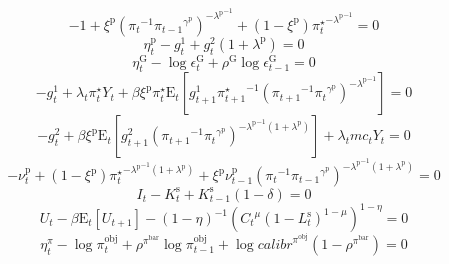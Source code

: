 \begin{equation}
-1 + {\xi^{\mathrm{p}}} {\left({\pi_{t}}^{-1} {{\pi_{t-1}}^{\gamma^{\mathrm{p}}}}\right)^{-{\lambda^{\mathrm{p}}}^{-1}}} + \left(1 - \xi^{\mathrm{p}}\right) {{\pi^{\star}_{t}}^{-{\lambda^{\mathrm{p}}}^{-1}}} = 0
\end{equation}
\begin{equation}
\eta^{\mathrm{p}}_{t} - g^{\mathrm{1}}_{t} + {g^{\mathrm{2}}_{t}} \left(1 + \lambda^{\mathrm{p}}\right) = 0
\end{equation}
\begin{equation}
\eta^{\mathrm{G}}_{t} - \log{\epsilon^{\mathrm{G}}_{t}} + {\rho^{\mathrm{G}}} {\log{\epsilon^{\mathrm{G}}_{t-1}}} = 0
\end{equation}
\begin{equation}
-g^{\mathrm{1}}_{t} + {\lambda_{t}} {\pi^{\star}_{t}} {Y_{t}} + {\beta} {\xi^{\mathrm{p}}} {\pi^{\star}_{t}} {\mathrm{E}_{t}\left[{g^{\mathrm{1}}_{t+1}} {\pi^{\star}_{t+1}}^{-1} {\left({\pi_{t+1}}^{-1} {{\pi_{t}}^{\gamma^{\mathrm{p}}}}\right)^{-{\lambda^{\mathrm{p}}}^{-1}}}\right]} = 0
\end{equation}
\begin{equation}
-g^{\mathrm{2}}_{t} + {\beta} {\xi^{\mathrm{p}}} {\mathrm{E}_{t}\left[{g^{\mathrm{2}}_{t+1}} {\left({\pi_{t+1}}^{-1} {{\pi_{t}}^{\gamma^{\mathrm{p}}}}\right)^{-{\lambda^{\mathrm{p}}}^{-1} \left(1 + \lambda^{\mathrm{p}}\right)}}\right]} + {\lambda_{t}} {{m\!c}_{t}} {Y_{t}} = 0
\end{equation}
\begin{equation}
-\nu^{\mathrm{p}}_{t} + \left(1 - \xi^{\mathrm{p}}\right) {{\pi^{\star}_{t}}^{-{\lambda^{\mathrm{p}}}^{-1} \left(1 + \lambda^{\mathrm{p}}\right)}} + {\xi^{\mathrm{p}}} {\nu^{\mathrm{p}}_{t-1}} {\left({\pi_{t}}^{-1} {{\pi_{t-1}}^{\gamma^{\mathrm{p}}}}\right)^{-{\lambda^{\mathrm{p}}}^{-1} \left(1 + \lambda^{\mathrm{p}}\right)}} = 0
\end{equation}
\begin{equation}
I_{t} - K^{\mathrm{s}}_{t} + {K^{\mathrm{s}}_{t-1}} \left(1 - \delta\right) = 0
\end{equation}
\begin{equation}
U_{t} - {\beta} {\mathrm{E}_{t}\left[U_{t+1}\right]} - \left(1 - \eta\right)^{-1} {\left({{C_{t}}^{\mu}} {\left(1 - L^{\mathrm{s}}_{t}\right)^{1 - \mu}}\right)^{1 - \eta}} = 0
\end{equation}
\begin{equation}
\eta^{\pi}_{t} - \log{\pi^{\mathrm{obj}}_{t}} + {\rho^{\pi^{\mathrm{bar}}}} {\log{\pi^{\mathrm{obj}}_{t-1}}} + {\log{{c\!a\!l\!i\!b\!r}^{\pi^{\mathrm{obj}}}}} \left(1 - \rho^{\pi^{\mathrm{bar}}}\right) = 0
\end{equation}
